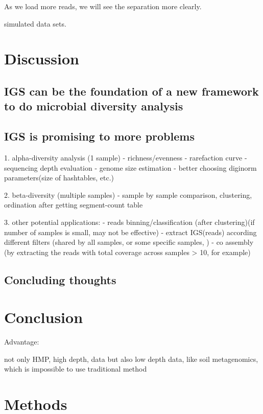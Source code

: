 \documentclass{article}
\begin{document}
As we load more reads, we will see the separation more clearly. 

simulated data sets. 



\section{Discussion}

\subsection{IGS can be the foundation of a new framework to do microbial diversity analysis}


\subsection{IGS is promising to more problems}

1. alpha-diversity analysis (1 sample)
    - richness/evenness
    - rarefaction curve
    - sequencing depth evaluation
    - genome size estimation
    - better choosing diginorm parameters(size of hashtables, etc.)

2. beta-diversity (multiple samples)
    - sample by sample comparison, clustering, ordination after getting segment-count table

3. other potential applications:
    - reads binning/classification (after clustering)(if number of samples is small, may not be effective)
    - extract IGS(reads) according different filters (shared by all samples, or some specific samples, )
    - co assembly (by extracting the reads with total coverage across samples > 10, for example)
    
    

\subsection{Concluding thoughts}



\section{Conclusion}
Advantage:

not only HMP, high depth, data
but also low depth data, like soil metagenomics, which is impossible to use traditional method 



\section{Methods}
\end{document}
